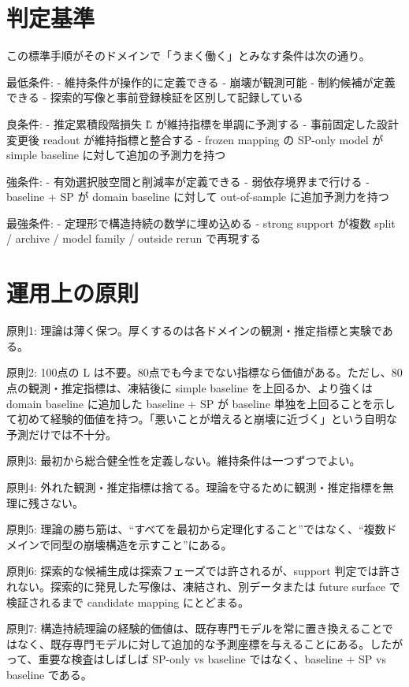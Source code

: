 \documentclass[12pt,a4paper]{article}
\begin{document}
\section{判定基準}\label{ux5224ux5b9aux57faux6e96}

この標準手順がそのドメインで「うまく働く」とみなす条件は次の通り。

最低条件: - 維持条件が操作的に定義できる - 崩壊が観測可能 - 制約候補が定義できる - 探索的写像と事前登録検証を区別して記録している

良条件: - 推定累積段階損失 L̂ が維持指標を単調に予測する - 事前固定した設計変更後 readout が維持指標と整合する - frozen mapping の SP-only model が simple baseline に対して追加の予測力を持つ

強条件: - 有効選択肢空間と削減率が定義できる - 弱依存境界まで行ける - baseline + SP が domain baseline に対して out-of-sample に追加予測力を持つ

最強条件: - 定理形で構造持続の数学に埋め込める - strong support が複数 split / archive / model family / outside rerun で再現する

\section{運用上の原則}\label{ux904bux7528ux4e0aux306eux539fux5247}

原則1: 理論は薄く保つ。厚くするのは各ドメインの観測・推定指標と実験である。

原則2: 100点の L は不要。80点でも今までない指標なら価値がある。ただし、80点の観測・推定指標は、凍結後に simple baseline を上回るか、より強くは domain baseline に追加した baseline + SP が baseline 単独を上回ることを示して初めて経験的価値を持つ。「悪いことが増えると崩壊に近づく」という自明な予測だけでは不十分。

原則3: 最初から総合健全性を定義しない。維持条件は一つずつでよい。

原則4: 外れた観測・推定指標は捨てる。理論を守るために観測・推定指標を無理に残さない。

原則5: 理論の勝ち筋は、``すべてを最初から定理化すること''ではなく、``複数ドメインで同型の崩壊構造を示すこと''にある。

原則6: 探索的な候補生成は探索フェーズでは許されるが、support 判定では許されない。探索的に発見した写像は、凍結され、別データまたは future surface で検証されるまで candidate mapping にとどまる。

原則7: 構造持続理論の経験的価値は、既存専門モデルを常に置き換えることではなく、既存専門モデルに対して追加的な予測座標を与えることにある。したがって、重要な検査はしばしば SP-only vs baseline ではなく、baseline + SP vs baseline である。
\end{document}
